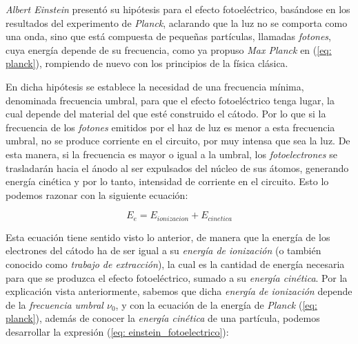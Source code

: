 \documentclass{article}
\numberwithin{equation}{section} %
\begin{document}
        \vspace{5mm}

        \textit{Albert Einstein} presentó su hipótesis para el efecto fotoeléctrico, basándose en los resultados del experimento de \textit{Planck}, aclarando que la luz no se comporta como una onda, sino que está compuesta de pequeñas partículas, llamadas \textit{fotones}, cuya energía depende de su frecuencia, como ya propuso \textit{Max Planck} en (\ref{eq: planck}), rompiendo de nuevo con los principios de la física clásica.

        \vspace{5mm}

        En dicha hipótesis se establece la necesidad de una frecuencia mínima, denominada frecuencia umbral, para que el efecto fotoeléctrico tenga lugar, la cual depende del material del que esté construido el cátodo. Por lo que si la frecuencia de los \textit{fotones} emitidos por el haz de luz es menor a esta frecuencia umbral, no se produce corriente en el circuito, por muy intensa que sea la luz. De esta manera, si la frecuencia es mayor o igual a la umbral, los \textit{fotoelectrones} se trasladarán hacia el ánodo al ser expulsados del núcleo de sus átomos, generando energía cinética y por lo tanto, intensidad de corriente en el circuito. Esto lo podemos razonar con la siguiente ecuación:

        \vspace{5mm}

        \begin{equation}
            E_e = E_{ionizacion} + E_{cinetica}
            \label{eq: einstein_fotoelectrico}
        \end{equation}

        \vspace{5mm}

        Esta ecuación tiene sentido visto lo anterior, de manera que la energía de los electrones del cátodo ha de ser igual a su \textit{energía de ionización} (o también conocido como \textit{trabajo de extracción}), la cual es la cantidad de energía necesaria para que se produzca el efecto fotoeléctrico, sumado a su \textit{energía cinética}. Por la explicación vista anteriormente, sabemos que dicha \textit{energía de ionización} depende de la \textit{frecuencia umbral \( \nu_{0} \)}, y con la ecuación de la energía de \textit{Planck} (\ref{eq: planck}), además de conocer la \textit{energía cinética} de una partícula, podemos desarrollar la expresión (\ref{eq: einstein_fotoelectrico}):
\end{document}
